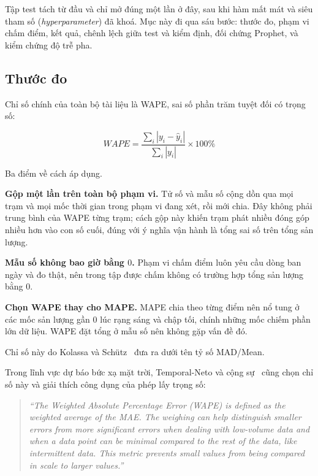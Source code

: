 \documentclass[12pt, a4paper]{report}
\begin{document}
Tập test tách từ đầu và chỉ mở đúng một lần ở đây, sau khi hàm mất mát và siêu tham số
(\textit{hyperparameter}) đã khoá. Mục này đi qua sáu bước: thước đo, phạm vi chấm điểm, kết
quả, chênh lệch giữa test và kiểm định, đối chứng Prophet, và kiểm chứng độ trễ pha.

\FloatBarrier
\subsection{Thước đo}

Chỉ số chính của toàn bộ tài liệu là WAPE, sai số phần trăm tuyệt đối có trọng số:

\begin{equation}
WAPE = \frac{\sum_i \left| y_i - \hat{y}_i \right|}{\sum_i \left| y_i \right|} \times 100\%
\end{equation}

Ba điểm về cách áp dụng.

\textbf{Gộp một lần trên toàn bộ phạm vi.} Tử số và mẫu số cộng dồn qua mọi trạm và mọi mốc
thời gian trong phạm vi đang xét, rồi mới chia. Đây không phải trung bình của WAPE từng trạm;
cách gộp này khiến trạm phát nhiều đóng góp nhiều hơn vào con số cuối, đúng với ý nghĩa vận
hành là tổng sai số trên tổng sản lượng.

\textbf{Mẫu số không bao giờ bằng $0$.} Phạm vi chấm điểm luôn yêu cầu dòng ban ngày và đo
thật, nên trong tập được chấm không có trường hợp tổng sản lượng bằng $0$.

\textbf{Chọn WAPE thay cho MAPE.} MAPE chia theo từng điểm nên nổ tung ở các mốc sản
lượng gần $0$ lúc rạng sáng và chập tối, chính những mốc chiếm phần lớn dữ liệu. WAPE đặt
tổng ở mẫu số nên không gặp vấn đề đó.

Chỉ số này do Kolassa và Schütz~\cite{kolassa2007mad} đưa ra dưới tên tỷ số MAD/Mean.

Trong lĩnh vực dự báo bức xạ mặt trời, Temporal-Neto và cộng sự~\cite{pin2025wape} cũng chọn
chỉ số này và giải thích công dụng của phép lấy trọng số:

\begin{quote}\small
\textit{``The Weighted Absolute Percentage Error (WAPE) is defined as the weighted average of
the MAE. The weighing can help distinguish smaller errors from more significant errors when
dealing with low-volume data and when a data point can be minimal compared to the rest of the
data, like intermittent data. This metric prevents small values from being compared in scale to
larger values.''}
\end{quote}
\end{document}

